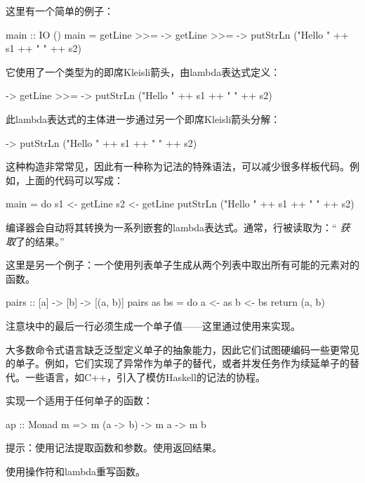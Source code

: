 \documentclass[DaoFP]{subfiles}
\begin{document}
    这里有一个简单的例子：
    \begin{haskell}
        main :: IO ()
        main =
        getLine >>=  ->
        getLine >>=  ->
        putStrLn ("Hello " ++ s1 ++ " " ++ s2)
    \end{haskell}
    它使用了一个类型为的即席Kleisli箭头，由lambda表达式定义：
    \begin{haskell}
         ->
        getLine >>=  ->
        putStrLn ("Hello " ++ s1 ++ " " ++ s2)
    \end{haskell}
    此lambda表达式的主体进一步通过另一个即席Kleisli箭头分解：
    \begin{haskell}
         -> putStrLn ("Hello " ++ s1 ++ " " ++ s2)
    \end{haskell}

    这种构造非常常见，因此有一种称为记法的特殊语法，可以减少很多样板代码。例如，上面的代码可以写成：
    \begin{haskell}
        main = do
        s1 <- getLine
        s2 <- getLine
        putStrLn ("Hello " ++ s1 ++ " " ++ s2)
    \end{haskell}
    编译器会自动将其转换为一系列嵌套的lambda表达式。通常，行被读取为：“ \emph{获取}了的结果。”

    这里是另一个例子：一个使用列表单子生成从两个列表中取出所有可能的元素对的函数。
    \begin{haskell}
        pairs :: [a] -> [b] -> [(a, b)]
        pairs as bs = do
        a <- as
        b <- bs
        return (a, b)
    \end{haskell}
    注意块中的最后一行必须生成一个单子值——这里通过使用来实现。

    大多数命令式语言缺乏泛型定义单子的抽象能力，因此它们试图硬编码一些更常见的单子。例如，它们实现了异常作为单子的替代，或者并发任务作为续延单子的替代。一些语言，如C++，引入了模仿Haskell的记法的协程。

    \begin{exercise}
        实现一个适用于任何单子的函数：
        \begin{haskell}
            ap :: Monad m => m (a -> b) -> m a -> m b
        \end{haskell}
        提示：使用记法提取函数和参数。使用返回结果。
    \end{exercise}

    \begin{exercise}
        使用操作符和lambda重写函数。
    \end{exercise}
\end{document}

